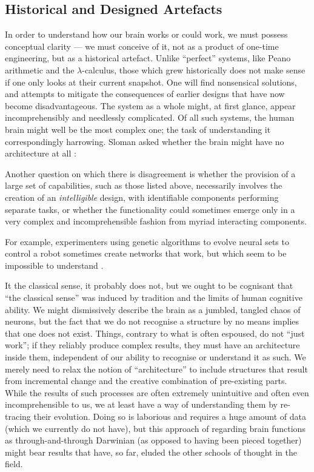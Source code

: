 \subsection{Historical and Designed Artefacts}
In order to understand how our brain works or could work, we must possess conceptual clarity --- we must conceive of it, not as a product of one-time engineering, but as a historical artefact. Unlike ``perfect'' systems, like Peano arithmetic and the $\lambda$-calculus, those which grew historically does not make sense if one only looks at their current snapshot. One will find nonsensical solutions, and attempts to mitigate the consequences of earlier designs that have now become disadvantageous. The system as a whole might, at first glance, appear incomprehensibly and needlessly complicated. Of all such systems, the human brain might well be the most complex one; the task of understanding it correspondingly harrowing. Sloman asked whether the brain might have no architecture at all  \cite[p.\ 5]{sloman1997}:

\begin{emquote}
	Another question on which there is disagreement is whether the provision of a large set of capabilities, such as those listed above, necessarily involves the creation of an {\em intelligible} design, with identifiable components performing separate tasks, or whether the functionality could sometimes  emerge only in a very complex and incomprehensible fashion from myriad interacting components.
	
	For example, experimenters using genetic algorithms to evolve neural sets to control a robot sometimes create networks that work, but which seem to be impossible to understand .
\end{emquote}

It the classical sense, it probably does not, but we ought to be cognisant that ``the classical sense'' was induced by tradition and the limits of human cognitive ability. We might dismissively describe the brain as a jumbled, tangled chaos of neurons, but the fact that we do not recognise a structure by no means implies that one does not exist. Things, contrary to what is often espoused, do not ``just work''; if they reliably produce complex results, they must have an architecture inside them, independent of our ability to recognise or understand it as such. We merely need to relax the notion of ``architecture'' to include structures that result from incremental change and the creative combination of pre-existing parts. While the results of such processes are often extremely unintuitive and often even incomprehensible to us, we at least have a way of understanding them by re-tracing their evolution. Doing so is laborious and requires a huge amount of data (which we currently do not have), but this approach of regarding brain functions as through-and-through Darwinian (as opposed to having been pieced together) might bear results that have, so far, eluded the other schools of thought in the field.

